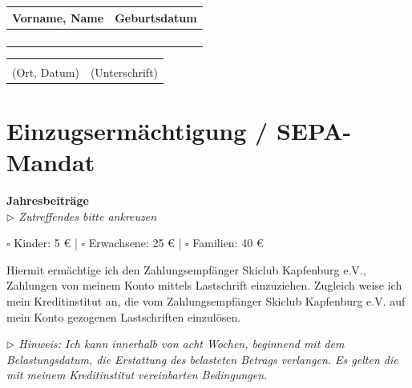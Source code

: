 \documentclass[a4paper,12pt]{article}
\begin{document}
\begin{tabularx}{\textwidth}{|X|p{4cm}|}
\hline
\textbf{Vorname, Name} & \textbf{Geburtsdatum} \\
\hline
\vspace{1em} & \\
\hline
\vspace{1em} & \\
\hline
\vspace{1em} & \\
\hline
\vspace{1em} & \\
\hline
\end{tabularx}

\vspace{2em}

\begin{tabularx}{\textwidth}{X X}
\hrulefill & \hrulefill \\
\small (Ort, Datum) & \small (Unterschrift)
\end{tabularx}

\newpage

\section*{Einzugsermächtigung / SEPA-Mandat}

\textbf{Jahresbeiträge}\\
\textit{\scriptsize{$\triangleright$ Zutreffendes bitte ankreuzen}}\\

\vspace{.2em}

$\square$ Kinder: 5 € \quad | \quad $\square$ Erwachsene: 25 € \quad | \quad $\square$ Familien: 40 €

\vspace{1em}

Hiermit ermächtige ich den Zahlungsempfänger Skiclub Kapfenburg e.V., 
Zahlungen von meinem Konto mittels Lastschrift einzuziehen. Zugleich weise ich mein Kreditinstitut an, 
die vom Zahlungsempfänger Skiclub Kapfenburg e.V. auf mein Konto gezogenen Lastschriften einzulösen.

\textit{\scriptsize{$\triangleright$ Hinweis: Ich kann innerhalb von acht Wochen, beginnend mit dem Belastungsdatum, die Erstattung 
des belasteten Betrags verlangen. Es gelten die mit meinem Kreditinstitut vereinbarten Bedingungen.}}

\vspace{1.2em}
\end{document}
